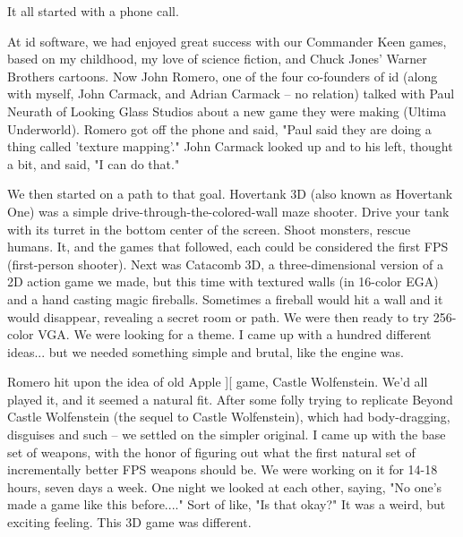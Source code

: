 It all started with a phone call.\\
\par
At id software, we had enjoyed great success with our Commander Keen games, based on my childhood, my love of science fiction, and Chuck Jones' Warner Brothers cartoons. Now John Romero, one of the four co-founders of id (along with myself, John Carmack, and Adrian Carmack -- no relation) talked with Paul Neurath of Looking Glass Studios about a new game they were making (Ultima Underworld).  Romero got off the phone and said, "Paul said they are doing a thing called 'texture mapping'." John Carmack looked up and to his left, thought a bit, and said, "I can do that."\\
\par
We then started on a path to that goal. Hovertank 3D (also known as Hovertank One) was a simple drive-through-the-colored-wall maze shooter. Drive your tank with its turret in the bottom center of the screen. Shoot monsters, rescue humans. It, and the games that followed, each could be considered the first FPS (first-person shooter). Next was Catacomb 3D, a three-dimensional version of a 2D action game we made, but this time with textured walls (in 16-color EGA) and a hand casting magic fireballs.  Sometimes a fireball would hit a wall and it would disappear, revealing a secret room or path. We were then ready to try 256-color VGA.  We were looking for a theme. I came up with a hundred different ideas... but we needed something simple and brutal, like the engine was.\\
\par
Romero hit upon the idea of old Apple ][ game, Castle Wolfenstein. We'd all played it, and it seemed a natural fit. After some folly trying to replicate Beyond Castle Wolfenstein (the sequel to Castle Wolfenstein), which had body-dragging, disguises and such -- we settled on the simpler original. I came up with the base set of weapons, with the honor of figuring out what the first natural set of incrementally better FPS weapons should be. We were working on it for 14-18 hours, seven days a week. One night we looked at each other, saying, "No one's made a game like this before...." Sort of like, "Is that okay?" It was a weird, but exciting feeling. This 3D game was different.\\
\par
